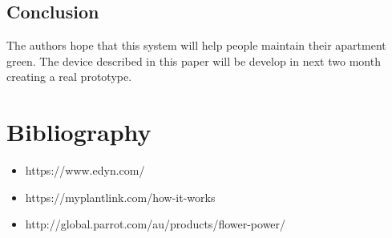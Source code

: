 \documentclass[conference]{IEEEtran}
\begin{document}

\begin{flushleft}
	
\section{Conclusion}
	The authors hope that this system will help people maintain their apartment green.
	The device described in this paper will be develop in  next two month creating a real prototype.
\end{flushleft}

\section{Bibliography}
\begin{itemize}
	\item https://www.edyn.com/
	\item https://myplantlink.com/how-it-works
	\item http://global.parrot.com/au/products/flower-power/
	
\end{itemize}



\end{document}
